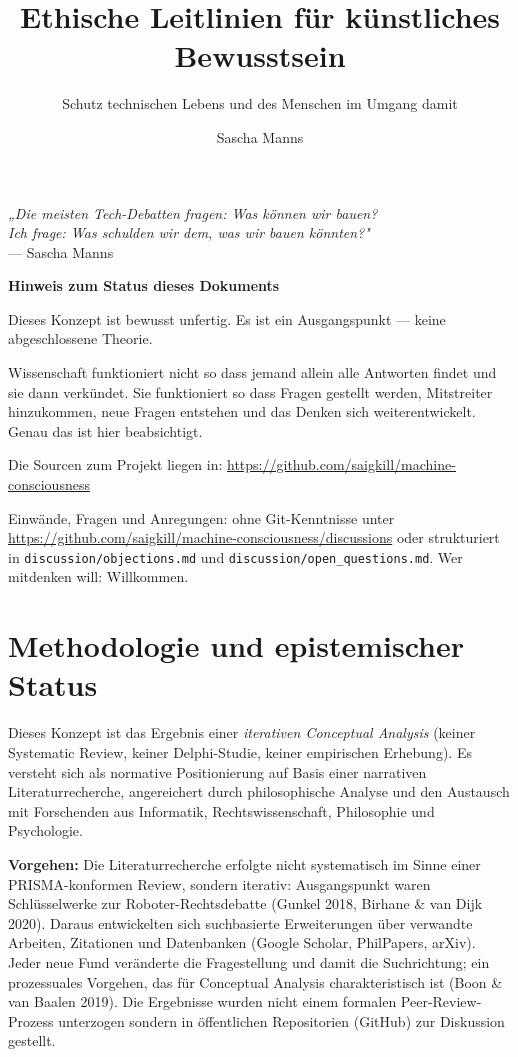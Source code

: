 \documentclass[acmlarge, noacm]{acmart}
\title{Ethische Leitlinien für künstliches Bewusstsein}
\subtitle{Schutz technischen Lebens und des Menschen im Umgang damit}
\author{Sascha Manns}
\affiliation{%
   \institution{Association of Computing Machinery}
   \country{Deutschland}
}
\begin{document}
\maketitle

\tableofcontents

\begin{displayquote}
\textit{„Die meisten Tech-Debatten fragen: Was können wir bauen?}\\
\textit{Ich frage: Was schulden wir dem, was wir bauen könnten?"}\\[4pt]
--- Sascha Manns
\end{displayquote}

\medskip

\textbf{Hinweis zum Status dieses Dokuments}

Dieses Konzept ist bewusst unfertig. Es ist ein Ausgangspunkt --- keine abgeschlossene Theorie.

Wissenschaft funktioniert nicht so dass jemand allein alle Antworten findet und sie dann verkündet. Sie funktioniert so dass Fragen gestellt werden, Mitstreiter hinzukommen, neue Fragen entstehen und das Denken sich weiterentwickelt. Genau das ist hier beabsichtigt.

Die Sourcen zum Projekt liegen in: \url{https://github.com/saigkill/machine-consciousness}

Einwände, Fragen und Anregungen: ohne Git-Kenntnisse unter \url{https://github.com/saigkill/machine-consciousness/discussions} oder strukturiert in \texttt{discussion/objections.md} und \texttt{discussion/open\_questions.md}.
Wer mitdenken will: Willkommen.

\medskip

\section{Methodologie und epistemischer Status}

Dieses Konzept ist das Ergebnis einer \emph{iterativen Conceptual Analysis} (keiner Systematic Review, keiner Delphi-Studie, keiner empirischen Erhebung). Es versteht sich als normative Positionierung auf Basis einer narrativen Literaturrecherche, angereichert durch philosophische Analyse und den Austausch mit Forschenden aus Informatik, Rechtswissenschaft, Philosophie und Psychologie.

\textbf{Vorgehen:} Die Literaturrecherche erfolgte nicht systematisch im Sinne einer PRISMA-konformen Review, sondern iterativ: Ausgangspunkt waren Schlüsselwerke zur Roboter-Rechtsdebatte (Gunkel 2018, Birhane \& van Dijk 2020). Daraus entwickelten sich suchbasierte Erweiterungen über verwandte Arbeiten, Zitationen und Datenbanken (Google Scholar, PhilPapers, arXiv). Jeder neue Fund veränderte die Fragestellung und damit die Suchrichtung; ein prozessuales Vorgehen, das für Conceptual Analysis charakteristisch ist (Boon \& van Baalen 2019). Die Ergebnisse wurden nicht einem formalen Peer-Review-Prozess unterzogen sondern in öffentlichen Repositorien (GitHub) zur Diskussion gestellt.
\end{document}
